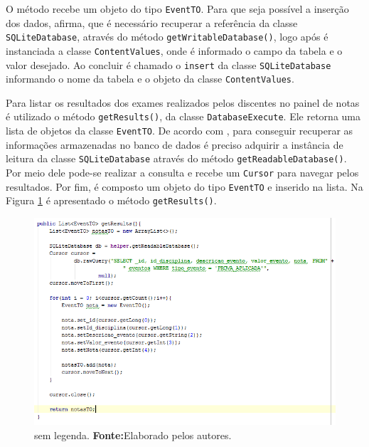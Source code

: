 	\par O método recebe um objeto do tipo \texttt{EventTO}. Para que seja possível
a inserção dos dados,  afirma, que é necessário
recuperar a referência da classe \texttt{SQLiteDatabase}, através do método
\texttt{getWritableDatabase()}, logo após é instanciada a classe
\texttt{ContentValues}, onde é informado o campo da tabela e o valor desejado.
Ao concluir é chamado o \texttt{insert} da classe \texttt{SQLiteDatabase}
informando o nome da tabela e o objeto da classe \texttt{ContentValues}.

	\par Para listar os resultados dos exames realizados pelos discentes no painel
de notas é utilizado o método \texttt{getResults()}, da classe
\texttt{DatabaseExecute}. Ele retorna uma lista de objetos da classe
\texttt{EventTO}. De acordo com , para conseguir
recuperar as informações armazenadas no banco de dados é preciso adquirir a
instância de leitura da classe \texttt{SQLiteDatabase} através do método
\texttt{getReadableDatabase()}. Por meio dele pode-se realizar a consulta e
recebe um \texttt{Cursor} para navegar pelos resultados. Por fim, é composto um
objeto do tipo \texttt{EventTO} e inserido na lista. Na Figura
\ref{fig:aplicativo7} é apresentado o método \texttt{getResults()}.

	\begin{figure}[h!] 
		\centerline{\includegraphics[scale=0.60]{./imagens/2_q_metodologico/4_procedimentos_resultados/42_aplicativo/aplicativo7.png}}
		\caption[sem legenda]{sem legenda. \textbf{Fonte:}Elaborado pelos autores.}
		\label{fig:aplicativo7}
	\end{figure}
	
